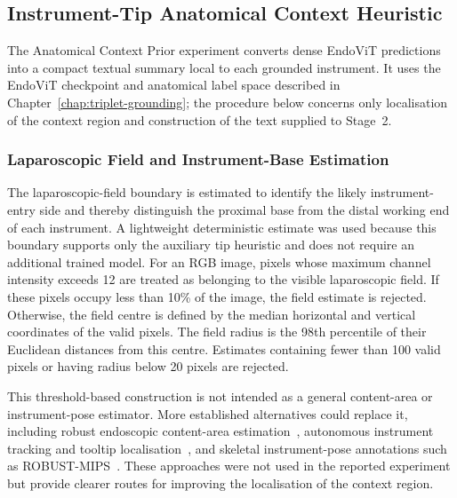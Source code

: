\subsection{Instrument-Tip Anatomical Context Heuristic}
\label{sec:c5:appendix-tip-prior}

The Anatomical Context Prior experiment converts dense EndoViT predictions into a compact textual summary local to each grounded instrument. It uses the EndoViT checkpoint and anatomical label space described in Chapter~\ref{chap:triplet-grounding}; the procedure below concerns only localisation of the context region and construction of the text supplied to Stage~2.

\subsubsection{Laparoscopic Field and Instrument-Base Estimation}

The laparoscopic-field boundary is estimated to identify the likely instrument-entry side and thereby distinguish the proximal base from the distal working end of each instrument. A lightweight deterministic estimate was used because this boundary supports only the auxiliary tip heuristic and does not require an additional trained model. For an RGB image, pixels whose maximum channel intensity exceeds 12 are treated as belonging to the visible laparoscopic field. If these pixels occupy less than 10\% of the image, the field estimate is rejected. Otherwise, the field centre is defined by the median horizontal and vertical coordinates of the valid pixels. The field radius is the 98th percentile of their Euclidean distances from this centre. Estimates containing fewer than 100 valid pixels or having radius below 20 pixels are rejected.

This threshold-based construction is not intended as a general content-area or instrument-pose estimator. More established alternatives could replace it, including robust endoscopic content-area estimation~\cite{budd2023contentarea}, autonomous instrument tracking and tooltip localisation~\cite{gruijthuijsen2022robotic}, and skeletal instrument-pose annotations such as ROBUST-MIPS~\cite{han2025robust}. These approaches were not used in the reported experiment but provide clearer routes for improving the localisation of the context region.


